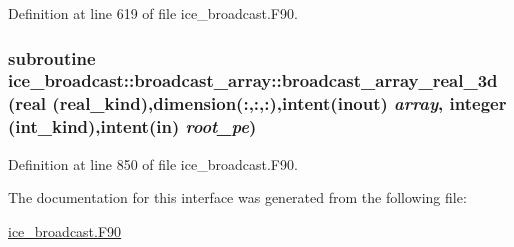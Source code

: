 Definition at line 619 of file ice\_\-broadcast.F90.\hypertarget{interfaceice__broadcast_1_1broadcast__array_a897b1c7a8e6180c94de254cb0868e3ac}{
\subsubsection[{broadcast\_\-array\_\-real\_\-3d}]{\setlength{\rightskip}{0pt plus 5cm}subroutine ice\_\-broadcast::broadcast\_\-array::broadcast\_\-array\_\-real\_\-3d (real (real\_\-kind),dimension(:,:,:),intent(inout) {\em array}, \/  integer (int\_\-kind),intent(in) {\em root\_\-pe})}}
\label{interfaceice__broadcast_1_1broadcast__array_a897b1c7a8e6180c94de254cb0868e3ac}


Definition at line 850 of file ice\_\-broadcast.F90.

The documentation for this interface was generated from the following file:\begin{DoxyCompactItemize}
\item 
\hyperlink{ice__broadcast_8F90}{ice\_\-broadcast.F90}\end{DoxyCompactItemize}

